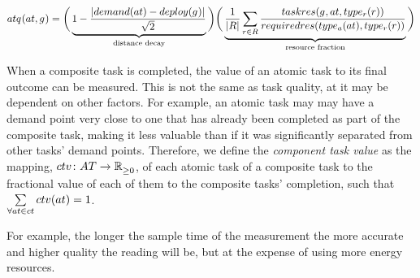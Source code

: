 \begin{equation}
	\label{eq:atomic_task_quality}
	\functionAtomicTaskQualitySignature{}{} = 
\bigg (
\underbrace{
	1 - \frac{\funcSize{
			\functionTaskDemandPoint{}{} - \functionDeployment{\varAgent{}{}}{} 
		}{}}{{\sqrt{2}}}
}_{\text{distance decay}}
\bigg )
\bigg (
\underbrace{
	\frac{1}{\funcSize{\setResource{}{}}}\sum_{\varResource{}{} \in \setResource{}{}} 
	\frac
	{\functionTaskResourceAllocationInstance{}{}}
	{\functionRequiredResourcesInstance{}{}}
}_{\text{resource fraction}}
\bigg )
\end{equation}

When a composite task is completed, the value of an atomic task to its final outcome can be measured. This is not the same as task quality, at it may be dependent on other factors. For example, 
an atomic task may may have a demand point very close to one that has already been completed as part of the composite task, making it less valuable than if it was significantly separated from other tasks' demand points. Therefore, we define the \textit{component task value} as the mapping, $\formalComponentTaskValue{}{}$,  of each atomic task of a composite task to the fractional value of each of them to the composite tasks' completion, such that $\sum\limits_{\forall \varAtomicTask{}{} \in \varCompositeTask{}{}} \functionComponentTaskValue{}{} = 1$.

For example, the longer the sample time of the measurement the more accurate and higher quality the reading will be, but at the expense of using more energy resources. 

